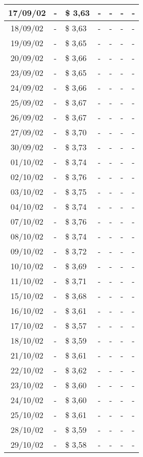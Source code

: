 \begin{center}
\begin{longtable}{|c|p{1.5cm}|p{1.5cm}|p{1.5cm}|p{1.5cm}|p{1.5cm}|p{1.5cm}|}
17/09/02 & - & \$ 3,63 & - & - & - & - \\ \hline
18/09/02 & - & \$ 3,63 & - & - & - & - \\ \hline
19/09/02 & - & \$ 3,65 & - & - & - & - \\ \hline
20/09/02 & - & \$ 3,66 & - & - & - & - \\ \hline
23/09/02 & - & \$ 3,65 & - & - & - & - \\ \hline
24/09/02 & - & \$ 3,66 & - & - & - & - \\ \hline
25/09/02 & - & \$ 3,67 & - & - & - & - \\ \hline
26/09/02 & - & \$ 3,67 & - & - & - & - \\ \hline
27/09/02 & - & \$ 3,70 & - & - & - & - \\ \hline
30/09/02 & - & \$ 3,73 & - & - & - & - \\ \hline
01/10/02 & - & \$ 3,74 & - & - & - & - \\ \hline
02/10/02 & - & \$ 3,76 & - & - & - & - \\ \hline
03/10/02 & - & \$ 3,75 & - & - & - & - \\ \hline
04/10/02 & - & \$ 3,74 & - & - & - & - \\ \hline
07/10/02 & - & \$ 3,76 & - & - & - & - \\ \hline
08/10/02 & - & \$ 3,74 & - & - & - & - \\ \hline
09/10/02 & - & \$ 3,72 & - & - & - & - \\ \hline
10/10/02 & - & \$ 3,69 & - & - & - & - \\ \hline
11/10/02 & - & \$ 3,71 & - & - & - & - \\ \hline
15/10/02 & - & \$ 3,68 & - & - & - & - \\ \hline
16/10/02 & - & \$ 3,61 & - & - & - & - \\ \hline
17/10/02 & - & \$ 3,57 & - & - & - & - \\ \hline
18/10/02 & - & \$ 3,59 & - & - & - & - \\ \hline
21/10/02 & - & \$ 3,61 & - & - & - & - \\ \hline
22/10/02 & - & \$ 3,62 & - & - & - & - \\ \hline
23/10/02 & - & \$ 3,60 & - & - & - & - \\ \hline
24/10/02 & - & \$ 3,60 & - & - & - & - \\ \hline
25/10/02 & - & \$ 3,61 & - & - & - & - \\ \hline
28/10/02 & - & \$ 3,59 & - & - & - & - \\ \hline
29/10/02 & - & \$ 3,58 & - & - & - & - \\ \hline

\end{longtable}
\end{center}
